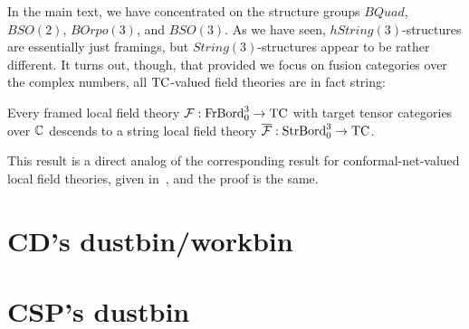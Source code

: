 \documentclass{amsart}
\begin{document}
In the main text, we have concentrated on the structure groups $BQuad$, $BSO(2)$, $BOrpo(3)$, and $BSO(3)$.  As we have seen, $hString(3)$-structures are essentially just framings, but $String(3)$-structures appear to be rather different.  It turns out, though, that provided we focus on fusion categories over the complex numbers, all $\mathrm{TC}$-valued field theories are in fact string:

\begin{proposition} \label{prop-string}
Every framed local field theory $\mathcal F : \mathrm{FrBord}_0^3 \rightarrow \mathrm{TC}$ with target tensor categories over $\mathbb C$ descends to a string local field theory $\overline{\mathcal F} : \mathrm{StrBord}_0^3 \rightarrow \mathrm{TC}$.
\end{proposition}

\nid This result is a direct analog of the corresponding result for conformal-net-valued local field theories, given in~\cite{bdh-lft}, and the proof is the same.


\section{CD's dustbin/workbin}


\section{CSP's dustbin}
\end{document}
